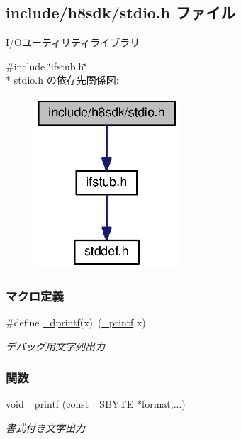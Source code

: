 \subsection{include/h8sdk/stdio.h ファイル}
\label{stdio_8h}


I/\+Oユーティリティライブラリ  


{\ttfamily \#include \char`\"{}ifstub.\+h\char`\"{}}\\*
stdio.\+h の依存先関係図\+:
\nopagebreak
\begin{figure}[H]
\begin{center}
\leavevmode
\includegraphics[width=154pt]{d6/d0f/stdio_8h__incl}
\end{center}
\end{figure}
\subsubsection*{マクロ定義}
\begin{DoxyCompactItemize}
\item 
\#define \hyperlink{stdio_8h_a834ddbd1908772c714ef89b4d059cc78_a834ddbd1908772c714ef89b4d059cc78}{\+\_\+dprintf}(x)~(\hyperlink{stdio_8h_a0299be37924541f117e05d8e03637146_a0299be37924541f117e05d8e03637146}{\+\_\+printf} x)
\begin{DoxyCompactList}\small\item\em デバッグ用文字列出力 \end{DoxyCompactList}\end{DoxyCompactItemize}
\subsubsection*{関数}
\begin{DoxyCompactItemize}
\item 
void \hyperlink{stdio_8h_a0299be37924541f117e05d8e03637146_a0299be37924541f117e05d8e03637146}{\+\_\+printf} (const \hyperlink{stddef_8h_aab65237ca9fbf4192a39cf12dd165942_aab65237ca9fbf4192a39cf12dd165942}{\+\_\+\+S\+B\+Y\+T\+E} $\ast$format,...)
\begin{DoxyCompactList}\small\item\em 書式付き文字出力 \end{DoxyCompactList}\end{DoxyCompactItemize}
